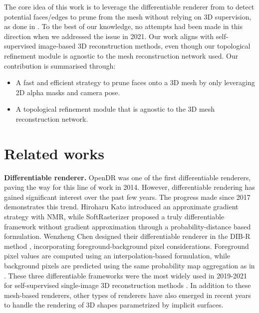 The core idea of this work is to leverage the differentiable renderer from \citep{ravi2020accelarating} to detect potential faces/edges to prune from the mesh without relying on 3D supervision, as done in \citep{pan2019deep,nie2020total3dunderstanding,smith2019geometrics}. To the best of our knowledge, no attempts had been made in this direction when we addressed the issue in 2021. Our work aligns with self-supervised image-based 3D reconstruction methods, even though our topological refinement module is agnostic to the mesh reconstruction network used. Our contribution is summarised through: 
\begin{itemize}
    
    \item A fast and efficient strategy to prune faces onto a 3D mesh by only leveraging 2D alpha masks and camera pose. 

    \item A topological refinement module that is agnostic to the 3D mesh reconstruction network.
\end{itemize}

\section{Related works}
\label{sec:related_works}

\noindent\textbf{Differentiable renderer.} OpenDR \citep{loper2014opendr} was one of the first differentiable renderers, paving the way for this line of work in 2014. However, differentiable rendering has gained significant interest over the past few years. The progress made since 2017 demonstrates this trend. Hiroharu Kato \etal introduced an approximate gradient strategy with NMR\citep{kato2018neural}, while SoftRasterizer \citep{liu2019soft} proposed a truly differentiable framework without gradient approximation through a probability-distance based formulation. Wenzheng Chen \etal designed their differentiable renderer in the DIB-R method \citep{chen2019learning}, incorporating foreground-background pixel considerations. Foreground pixel values are computed using an interpolation-based formulation, while background pixels are predicted using the same probability map aggregation as in \citep{liu2019soft}. These three differentiable frameworks were the most widely used in 2019-2021 for self-supervised single-image 3D reconstruction methods \citep{kanazawa2018learning,li2020self,pavllo2020convolutional}. In addition to these mesh-based renderers, other types of renderers \citep{niemeyer2020differentiable,jiang2020sdfdiff} have also emerged in recent years to handle the rendering of 3D shapes parametrized by implicit surfaces. 

